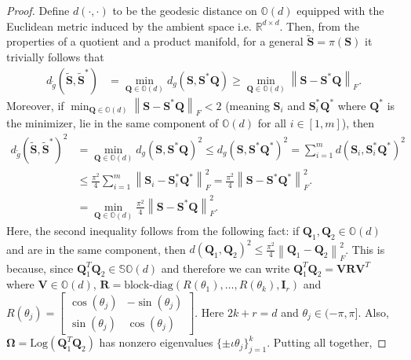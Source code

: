 \documentclass[10pt,a4paper]{amsart}
\newcommand{\blockdiag}{{\mathrm{block\text{-}diag}}}
\begin{document}
\begin{proof}
Define $d(\cdot,\cdot)$ to be the geodesic distance on $\mathbb{O}(d)$ equipped with the Euclidean metric induced by the ambient space i.e. $\mathbb{R}^{d \times d}$. Then, from the properties of a quotient and a product manifold, for a general $\widetilde{\mathbf{S}} = \pi(\mathbf{S})$ it trivially follows that 
\begin{align}
 d_{\widetilde{g}}(\widetilde{\mathbf{S}},\widetilde{\mathbf{S}}^{*}) &= \min_{\mathbf{Q}\in \mathbb{O}(d)} d_{g}(\mathbf{S},\mathbf{S}^{*}\mathbf{Q}) \geq \min_{\mathbf{Q}\in \mathbb{O}(d)} \left\|\mathbf{S} -\mathbf{S}^{*}\mathbf{Q}\right\|_F. \label{rev2:eq7}
\end{align}
Moreover, if $\min_{\mathbf{Q} \in \mathbb{O}(d)}\left\|\mathbf{S} - \mathbf{S}^*\mathbf{Q}\right\|_F < 2$ (meaning $\mathbf{S}_i$ and $\mathbf{S}^*_i\mathbf{Q}^*$ where $\mathbf{Q}^*$ is the minimizer, lie in the same component of $\mathbb{O}(d)$ for all $i \in [1,m]$), then
\begin{align}
 d_{\widetilde{g}}(\widetilde{\mathbf{S}},\widetilde{\mathbf{S}}^{*})^2 &= \min_{\mathbf{Q}\in \mathbb{O}(d)} d_{g}(\mathbf{S},\mathbf{S}^{*}\mathbf{Q})^2 \leq d_{g}(\mathbf{S},\mathbf{S}^{*}\mathbf{Q}^*)^2 = \sum_{i=1}^{m} d(\mathbf{S}_i,\mathbf{S}^{*}_i\mathbf{Q}^*)^2\\
 &\leq  \frac{\pi^2}{4} \sum_{i=1}^{m}\left\|\mathbf{S}_i -\mathbf{S}^{*}_i\mathbf{Q}^*\right\|_F^2 = \frac{\pi^2}{4} \left\|\mathbf{S} -\mathbf{S}^{*}\mathbf{Q}^*\right\|_F^2.\\
 &= \min_{\mathbf{Q}\in \mathbb{O}(d)}\frac{\pi^2}{4} \left\|\mathbf{S} -\mathbf{S}^{*}\mathbf{Q}\right\|_F^2.
\end{align}
Here, the second inequality follows from the following fact: if $\mathbf{Q}_1, \mathbf{Q}_2 \in \mathbb{O}(d)$ and are in the same component, then $d(\mathbf{Q}_1,\mathbf{Q}_2)^2 \leq \frac{\pi^2}{4} \left\|\mathbf{Q}_1-\mathbf{Q}_2\right\|_F^2$. This is because, since $\mathbf{Q}_1^T\mathbf{Q}_2 \in \mathbb{SO}(d)$ and therefore we can write $\mathbf{Q}_1^T\mathbf{Q}_2 = \mathbf{V}\mathbf{R}\mathbf{V}^T$ where $\mathbf{V} \in \mathbb{O}(d)$,
$\mathbf{R} = \blockdiag(R(\theta_1),\ldots,R(\theta_k),\mathbf{I}_r)$
and $R(\theta_j) = \begin{bmatrix}\cos(\theta_j) & -\sin(\theta_j)\\ \sin(\theta_j) & \cos(\theta_j)\end{bmatrix}$. Here $2k + r = d$ and $\theta_j \in (-\pi,\pi]$. Also, $\bm{\Omega} = \text{Log}(\mathbf{Q}_1^T\mathbf{Q}_2)$ has nonzero eigenvalues $\{\pm \iota \theta_j\}_{j=1}^{k}$. Putting all together,

\end{proof}
\end{document}
